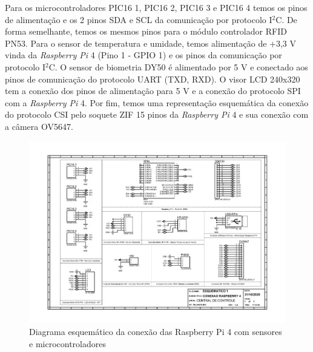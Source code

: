 \begin{apendicesenv}
Para os microcontroladores PIC16 1, PIC16 2, PIC16 3 e PIC16 4 temos os pinos de alimentação e os 2 pinos SDA e SCL da comunicação por protocolo I$^2$C. De forma semelhante, temos os mesmos pinos para o módulo controlador RFID PN53. Para o sensor de temperatura e umidade, temos alimentação de +3,3 V vinda da \textit{Raspberry Pi} 4  (Pino 1 - GPIO 1) e os pinos da comunicação por protocolo I$^2$C. O sensor de biometria DY50 é alimentado por 5 V e conectado aos pinos de comunicação do protocolo UART (TXD, RXD). O visor LCD 240x320 tem a conexão dos pinos de alimentação para 5 V e a conexão do protocolo SPI com a \textit{Raspberry Pi} 4. Por fim, temos uma representação esquemática da conexão do protocolo CSI pelo soquete ZIF 15 pinos da \textit{Raspberry Pi} 4 e sua conexão com a câmera OV5647.

\begin{landscape}
\begin{figure}[H]
    \centering
    \vspace{-2cm}
    \includegraphics[width=1.25\textwidth, height=2\textheight,keepaspectratio]{figuras/eletronica/esquematicos/esquematico_1_rpi4.pdf}
    \caption{Diagrama esquemático da conexão das Raspberry Pi 4 com sensores e microcontroladores}
    \label{fig:esquematico_1}
\end{figure}
\end{landscape}



\end{apendicesenv}
